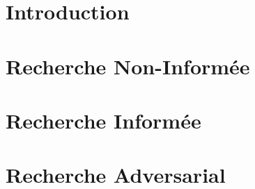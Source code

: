 \documentclass[a4paper, 12pt]{extarticle}
\begin{document}


\makemargins %
\makefrontpage
\maketoc


% 



\section{Introduction} %
\label{sec:introduction}

\newpage



\section{Recherche Non-Informée} %
\label{sec:recherche}



\section{Recherche Informée} %
\label{sec:recherche_informee} 

\newpage


\section{Recherche Adversarial} %
\label{sec:recherche_adversarial}


\end{document}
